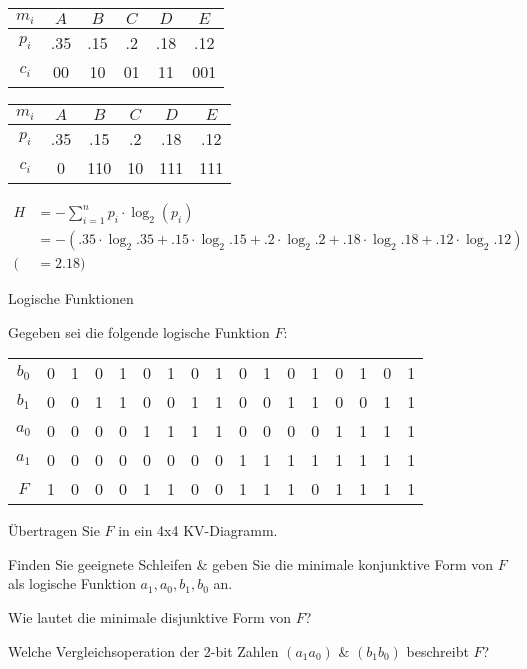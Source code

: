 \documentclass{exercisesheet}
\begin{document}
\begin{solutions}
  \item
  \begin{tabular}{c|ccccc}
    $m_i$ & $A$ & $B$ & $C$ & $D$ & $E$ \\
    \hline
    $p_i$ & .35 & .15 & .2  & .18 & .12 \\
    $c_i$ & 00  & 10  & 01  & 11  & 001 \\
  \end{tabular}
  \item
  \begin{tabular}{c|ccccc}
    $m_i$ & $A$ & $B$ & $C$ & $D$ & $E$ \\
    \hline
    $p_i$ & .35 & .15 & .2  & .18 & .12 \\
    $c_i$ & 0   & 110 & 10  & 111 & 111 \\
  \end{tabular}
  \item
  \begin{equation*}
    \begin{split}
      H & = -\sum_{i=1}^{n} p_i \cdot \log_2(p_i)                                                                         \\
        & = -(.35\cdot \log_2{.35}+ .15\cdot \log_2{.15}+ .2\cdot \log_2{.2}+ .18\cdot \log_2{.18}+ .12\cdot \log_2{.12}) \\
      ( & =2.18)
    \end{split}
  \end{equation*}
\end{solutions}

\begin{eexercises}{Logische Funktionen}{
    Gegeben sei die folgende logische Funktion $F$:
    \centering\begin{tabular}{c|cccc cccc cccc cccc}
      $b_0$ & 0 & 1 & 0 & 1 & 0 & 1 & 0 & 1 & 0 & 1 & 0 & 1 & 0 & 1 & 0 & 1 \\
      $b_1$ & 0 & 0 & 1 & 1 & 0 & 0 & 1 & 1 & 0 & 0 & 1 & 1 & 0 & 0 & 1 & 1 \\
      $a_0$ & 0 & 0 & 0 & 0 & 1 & 1 & 1 & 1 & 0 & 0 & 0 & 0 & 1 & 1 & 1 & 1 \\
      $a_1$ & 0 & 0 & 0 & 0 & 0 & 0 & 0 & 0 & 1 & 1 & 1 & 1 & 1 & 1 & 1 & 1 \\
      \hline
      $F$   & 1 & 0 & 0 & 0 & 1 & 1 & 0 & 0 & 1 & 1 & 1 & 0 & 1 & 1 & 1 & 1 \\
    \end{tabular}
  }
  \item Übertragen Sie $F$ in ein 4x4 KV-Diagramm.
  \item Finden Sie geeignete Schleifen \& geben Sie die minimale konjunktive Form von $F$ als logische Funktion $a_1, a_0, b_1, b_0$ an.
  \item Wie lautet die minimale disjunktive Form von $F$?
  \item Welche Vergleichsoperation der 2-bit Zahlen $(a_1a_0)$ \& $(b_1b_0)$ beschreibt $F$?
\end{eexercises}
\end{document}
